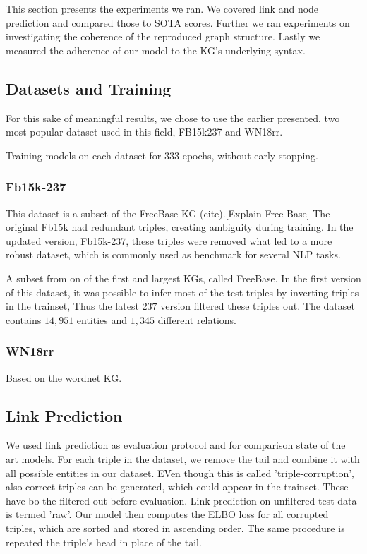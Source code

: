 
This section presents the experiments we ran. We covered link and node prediction and compared those to SOTA scores. Further we ran experiments on investigating the coherence of the reproduced graph structure. Lastly we measured the adherence of our model to the KG's underlying syntax.

\subsection{Datasets and Training}
For this sake of meaningful results, we chose to use the earlier presented, two most popular dataset used in this field, FB15k237 and WN18rr.

Training models on each dataset for 333 epochs, without early stopping.

\subsubsection{Fb15k-237}
This dataset is a subset of the FreeBase KG (cite).[Explain Free Base] The original Fb15k had redundant triples, creating ambiguity during training. In the updated version, Fb15k-237, these triples were removed what led to a more robust dataset, which is commonly used as benchmark for several NLP tasks.

A subset from on of the first and largest KGs, called FreeBase. In the first version of this dataset, it was possible to infer most of the test triples by inverting triples in the trainset, Thus the latest $237$ version filtered these triples out.
The dataset contains $14,951$ entities and $1,345$ different relations.

\subsubsection{WN18rr}
Based on the wordnet KG.


\subsection{Link Prediction}

We used link prediction as evaluation protocol and for comparison state of the art models. For each triple in the dataset, we remove the tail and combine it with all possible entities in our dataset. EVen though this is called 'triple-corruption', also correct triples can be generated, which could appear in the trainset. These have bo the filtered out before evaluation. Link prediction on unfiltered test data is termed 'raw'. Our model then computes the ELBO loss for all corrupted triples, which are sorted and stored in ascending order. The same procedure is repeated the triple's head in place of the tail.



